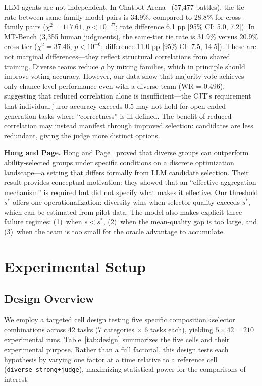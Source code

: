 \documentclass[10pt,twocolumn]{article}
\theoremstyle{remark}
\begin{document}
LLM agents are not independent. In Chatbot Arena~\cite{chiang2024chatbot} (57,477 battles), the tie rate between same-family model pairs is 34.9\%, compared to 28.8\% for cross-family pairs ($\chi^2 = 117.61$, $p < 10^{-27}$; rate difference 6.1 pp [95\% CI: 5.0, 7.2]). In MT-Bench (3,355 human judgments), the same-tier tie rate is 31.9\% versus 20.9\% cross-tier ($\chi^2 = 37.46$, $p < 10^{-6}$; difference 11.0 pp [95\% CI: 7.5, 14.5]). These are not marginal differences---they reflect structural correlations from shared training. Diverse teams reduce $\rho$ by mixing families, which in principle should improve voting accuracy. However, our data show that majority vote achieves only chance-level performance even with a diverse team (WR = 0.496), suggesting that reduced correlation alone is insufficient---the CJT's requirement that individual juror accuracy exceeds 0.5 may not hold for open-ended generation tasks where ``correctness'' is ill-defined. The benefit of reduced correlation may instead manifest through improved selection: candidates are less redundant, giving the judge more distinct options.

\textbf{Hong and Page.}
Hong and Page~\cite{hong2004groups} proved that diverse groups can outperform ability-selected groups under specific conditions on a discrete optimization landscape---a setting that differs formally from LLM candidate selection. Their result provides conceptual motivation: they showed that an ``effective aggregation mechanism'' is required but did not specify what makes it effective. Our threshold $s^*$ offers one operationalization: diversity wins when selector quality exceeds $s^*$, which can be estimated from pilot data. The model also makes explicit three failure regimes: (1)~when $s < s^*$, (2)~when the mean-quality gap is too large, and (3)~when the team is too small for the oracle advantage to accumulate.

\section{Experimental Setup}
\label{sec:experiments}

\subsection{Design Overview}

We employ a targeted cell design testing five specific composition$\times$selector combinations across 42 tasks (7 categories $\times$ 6 tasks each), yielding $5 \times 42 = 210$ experimental runs. Table~\ref{tab:design} summarizes the five cells and their experimental purpose. Rather than a full factorial, this design tests each hypothesis by varying one factor at a time relative to a reference cell (\texttt{diverse\_strong+judge}), maximizing statistical power for the comparisons of interest.
\end{document}
